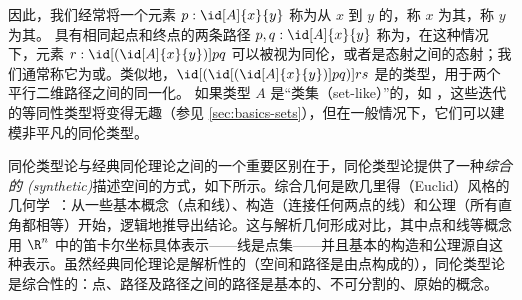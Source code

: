 因此，我们经常将一个元素 $p : \id[A]{x}{y}$ 称为从 $x$ 到 $y$ 的，称 $x$ 为其，称 $y$ 为其。 具有相同起点和终点的两条路径 $p,q : \id[A]{x}{y}$ 称为，在这种情况下，元素 $r : \id[{(\id[A]{x}{y})}]{p}{q}$ 可以被视为同伦，或者是态射之间的态射；我们通常称它为或。类似地，$\id[{(\id[{(\id[A]{x}{y})}]{p}{q})}]{r}{s}$ 是的类型，用于两个平行二维路径之间的同一化。 如果类型 $A$ 是“类集（set-like）”的，如 \nat，这些迭代的等同性类型将变得无趣（参见 \cref{sec:basics-sets}），但在一般情况下，它们可以建模非平凡的同伦类型。


同伦类型论与经典同伦理论之间的一个重要区别在于，同伦类型论提供了一种\emph{综合的 (synthetic)}描述空间的方式，如下所示。综合几何是欧几里得（Euclid）风格的几何学~\cite{Euclid}：从一些基本概念（点和线）、构造（连接任何两点的线）和公理（所有直角都相等）开始，逻辑地推导出结论。这与解析几何形成对比，其中点和线等概念用 $\R^n$ 中的笛卡尔坐标具体表示——线是点集——并且基本的构造和公理源自这种表示。虽然经典同伦理论是解析性的（空间和路径是由点构成的），同伦类型论是综合性的：点、路径及路径之间的路径是基本的、不可分割的、原始的概念。

